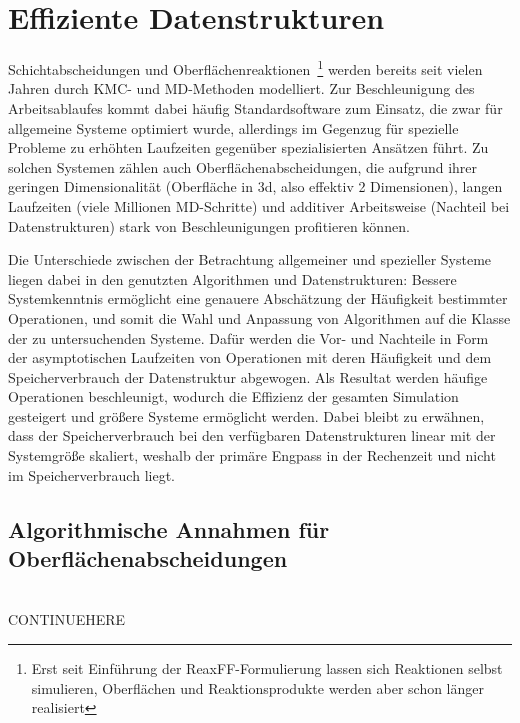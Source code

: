 \section{Effiziente Datenstrukturen}
\label{sec:datastructures}


Schichtabscheidungen und Oberflächenreaktionen\
\footnote{Erst seit Einführung der ReaxFF-Formulierung lassen sich Reaktionen selbst simulieren, Oberflächen und Reaktionsprodukte werden aber schon länger realisiert}
werden bereits seit vielen Jahren durch KMC- und MD-Methoden modelliert\todo{refs}.
Zur Beschleunigung des Arbeitsablaufes kommt dabei häufig Standardsoftware zum Einsatz, die zwar für allgemeine Systeme optimiert wurde,
allerdings im Gegenzug für spezielle Probleme zu erhöhten Laufzeiten gegenüber spezialisierten Ansätzen führt.
Zu solchen Systemen zählen auch Oberflächenabscheidungen, die aufgrund ihrer geringen Dimensionalität (Oberfläche in 3d, also effektiv 2 Dimensionen), langen Laufzeiten (viele Millionen MD-Schritte) und additiver Arbeitsweise (Nachteil bei Datenstrukturen) stark von Beschleunigungen profitieren können.


Die Unterschiede zwischen der Betrachtung allgemeiner und spezieller Systeme liegen dabei in den genutzten Algorithmen und Datenstrukturen:
Bessere Systemkenntnis ermöglicht eine genauere Abschätzung der Häufigkeit bestimmter Operationen, und somit die Wahl und Anpassung von Algorithmen auf die Klasse der zu untersuchenden Systeme.
Dafür werden die Vor- und Nachteile in Form der asymptotischen Laufzeiten von Operationen mit deren Häufigkeit und dem Speicherverbrauch der Datenstruktur abgewogen.
Als Resultat werden häufige Operationen beschleunigt, wodurch die Effizienz der gesamten Simulation gesteigert und größere Systeme ermöglicht werden.
Dabei bleibt zu erwähnen, dass der Speicherverbrauch bei den verfügbaren Datenstrukturen linear mit der Systemgröße skaliert, weshalb der primäre Engpass in der Rechenzeit und nicht im Speicherverbrauch liegt.

\subsection{Algorithmische Annahmen für Oberflächenabscheidungen}

\\CONTINUEHERE

